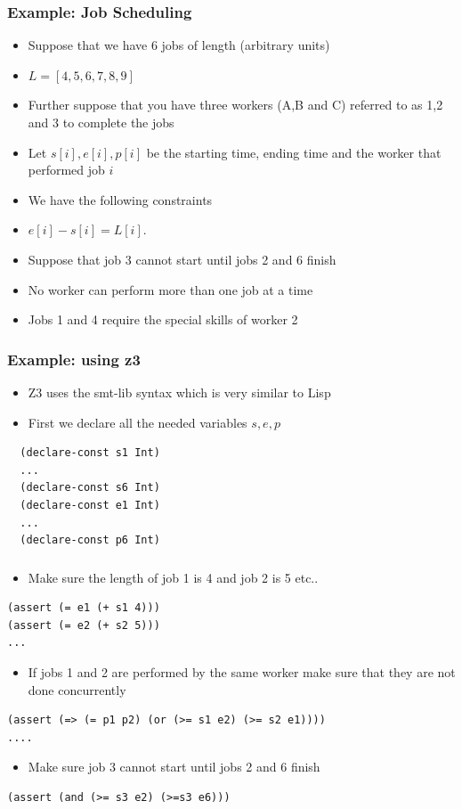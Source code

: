 \documentclass{beamer}
\begin{document}
\begin{frame}
  \frametitle{Example: Job Scheduling}
  \begin{itemize}
    \item Suppose that we have 6 jobs of length (arbitrary units)
    \item $L=[4,5,6,7,8,9]$
    \item Further suppose that you have three workers (A,B and C) 
    referred to as 1,2 and 3 to complete the jobs
    \item Let $s[i],e[i],p[i]$ be the starting time, ending time and the worker that performed job $i$
    \item We have the following constraints
    \item $e[i]-s[i]=L[i]$.
    \item Suppose that job 3 cannot start until jobs 2 and 6 finish 
    \item No worker can perform more than one job at a time
    \item Jobs 1 and 4 require the special skills of worker 2
  \end{itemize}
\end{frame}
\begin{frame}[fragile]
  \frametitle{Example: using z3}
\begin{itemize}
  \item Z3 uses the smt-lib syntax which is very 
  similar to Lisp
  \item First we declare all the needed variables $s,e,p$
\end{itemize}
\begin{verbatim}
  (declare-const s1 Int)
  ...
  (declare-const s6 Int)
  (declare-const e1 Int)
  ...
  (declare-const p6 Int)
\end{verbatim}  

\end{frame}
\begin{frame}[fragile]
  \frametitle{}
\begin{itemize}
  \item Make sure the length of job 1 is 4 and job 2 is 5 etc..
\end{itemize}
\begin{verbatim}
(assert (= e1 (+ s1 4)))
(assert (= e2 (+ s2 5)))
...  
\end{verbatim}  
\begin{itemize}
 \item If jobs 1 and 2 are performed by the same worker make sure that they are
 not done concurrently  
\end{itemize}
\begin{verbatim}
(assert (=> (= p1 p2) (or (>= s1 e2) (>= s2 e1))))
....  
\end{verbatim}
\begin{itemize}
 \item Make sure job 3 cannot start until jobs 2 and 6 finish 
\end{itemize}
\begin{verbatim}
(assert (and (>= s3 e2) (>=s3 e6)))  
\end{verbatim}
\end{frame}
\end{document}
